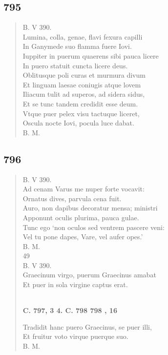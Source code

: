 \documentclass[11pt, a4paper]{report}
\begin{document}
            \subsection*{795}
      \begin{verse}
      B. V 390. \\ Lumina, colla, genae, flavi fexura capilli \\ In Ganymede suo flamma fuere Iovi. \\ Iuppiter in puerum quaerens sibi pauca licere \\ In puero statuit cuncta licere deus. \\ Oblitusque poli curas et murmura divum \\ Et linguam laesae coniugis atque lovem \\ Iliacum tulit ad superos, ad sidera sidus, \\ Et se tunc tandem credidit esse deum. \\ Vtque puer pelex visu tactuque liceret, \\ Oscula nocte Iovi, pocula luce dabat. \\ B. M. \\ 
      \end{verse}
  
            \subsection*{796}
      \begin{verse}
      B. V 390. \\ Ad cenam Varus me nuper forte vocavit: \\ Ornatus dives, parvula cena fuit. \\ Auro, non dapibus decoratur mensa; ministri \\ Apponunt oculis plurima, pauca gulae. \\ Tunc ego ‘non oculos sed ventrem pascere veni: \\ Vel tu pone dapes, Vare, vel aufer opes.’ \\ B. M. \\ 49 \\ B. V 390. \\ Graecinum virgo, puerum Graecinus amabat \\ Et puer in sola virgine captus erat. \\ 
        ﻿\pagebreak 
    \begin{center} \textbf{C. 797, 3 4. C. 798 798 , 16} \end{center} \marginpar{[074]} Tradidit hanc puero Graecinus, se puer illi, \\ Et fruitur voto virque puerque suo. \\ B. M. \\ 
      \end{verse}
  
\end{document}
